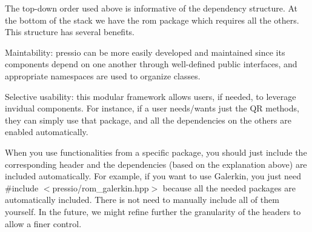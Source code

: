 The top-\/down order used above is informative of the dependency structure. At the bottom of the stack we have the {\ttfamily rom} package which requires all the others. This structure has several benefits.
\begin{DoxyItemize}
\item Maintability\+: {\ttfamily pressio} can be more easily developed and maintained since its components depend on one another through well-\/defined public interfaces, and appropriate namespaces are used to organize classes.
\item Selective usability\+: this modular framework allows users, if needed, to leverage invidual components. For instance, if a user needs/wants just the QR methods, they can simply use that package, and all the dependencies on the others are enabled automatically.
\end{DoxyItemize}



\begin{DoxyParagraph}{}
When you use functionalities from a specific package, you should just include the corresponding header and the dependencies (based on the explanation above) are included automatically. For example, if you want to use Galerkin, you just need {\ttfamily \#include $<$pressio/rom\+\_\+galerkin.\+hpp$>$} because all the needed packages are automatically included. There is not need to manually include all of them yourself. In the future, we might refine further the granularity of the headers to allow a finer control. 
\end{DoxyParagraph}
